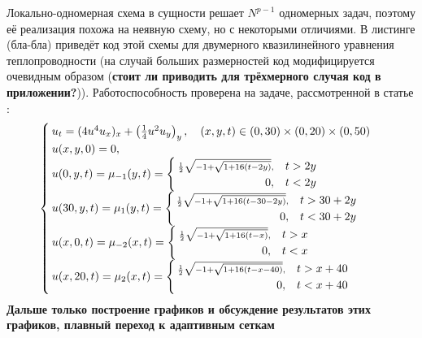 Локально-одномерная схема в сущности решает $N^{p - 1}$ одномерных задач, поэтому её реализация похожа на неявную схему, но с некоторыми отличиями.
В листинге (бла-бла) приведёт код этой схемы для двумерного квазилинейного уравнения теплопроводности (на случай больших размерностей код модифицируется очевидным образом (\textbf{стоит ли приводить для трёхмерного случая код в приложении?})).
Работоспособность проверена на задаче, рассмотренной в статье \cite{самарский1963примеры}:
\begin{equation*}
    \textstyle
    \begin{cases}
        u_t = (4u^4 u_x)_x + \left( \frac{1}{4} u^2 u_y \right)_y, \quad (x, y, t) \in (0, 30) \times (0, 20) \times (0, 50)\\
        u(x, y, 0) = 0,\\
        u(0, y, t) = \mu_{-1}(y, t) = \begin{cases}
            \scriptstyle\frac{1}{2}\sqrt{-1 + \sqrt{1 + 16(t - 2y)}}, & t > 2y\\
            \hfill 0, & t < 2y
        \end{cases}\\
        u(30, y, t) = \mu_1(y, t) = \begin{cases}
            \scriptstyle\frac{1}{2}\sqrt{-1 + \sqrt{1 + 16(t - 30 - 2y)}}, & t > 30 + 2y\\
            \hfill 0, & t < 30 + 2y
        \end{cases}\\
        u(x, 0, t) = \mu_{-2}(x, t) = \begin{cases}
            \scriptstyle\frac{1}{2}\sqrt{-1 + \sqrt{1 + 16(t - x)}}, & t > x\\
            \hfill 0, & t < x
        \end{cases}\\
        u(x, 20, t) = \mu_2(x, t) = \begin{cases}
            \scriptstyle\frac{1}{2}\sqrt{-1 + \sqrt{1 + 16(t - x - 40)}}, & t > x + 40\\
            \hfill 0, & t < x + 40
        \end{cases}
    \end{cases}
\end{equation*}
\textbf{Дальше только построение графиков и обсуждение результатов этих графиков, плавный переход к адаптивным сеткам}